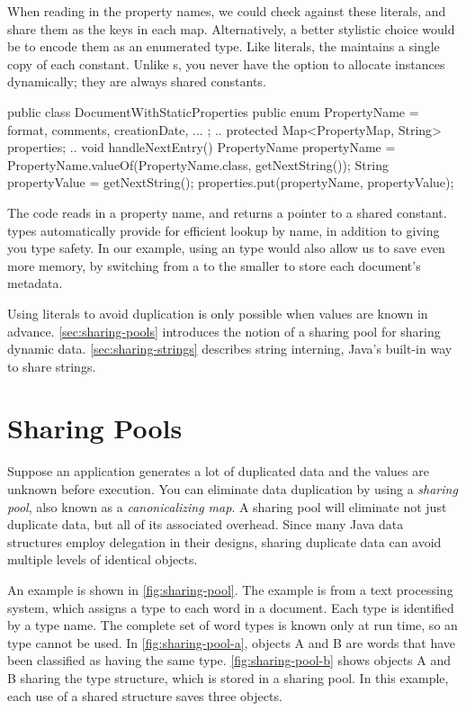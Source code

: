 When reading in the property names, we could check against these
literals, and share them as the keys in each map. 
Alternatively, a better stylistic choice would be to encode them as an
enumerated type. Like  literals, the \jre maintains a
single copy of each  constant. Unlike s,
you never have the option to allocate  instances dynamically; they
are always shared constants. 

\begin{shortlisting}
	public class DocumentWithStaticProperties {
		public enum PropertyName = 
			{format, comments, creationDate, ... };
		..
		protected Map<PropertyMap, String> properties; 
		..
		void handleNextEntry() {
			PropertyName propertyName = 
				PropertyName.valueOf(PropertyName.class, getNextString()); 
			String propertyValue = getNextString(); 
			properties.put(propertyName, propertyValue); }
	}
\end{shortlisting}

The code reads in a property name, and returns a pointer to a shared 
constant.  types automatically provide for
efficient lookup by name, in addition to giving you type safety. In our
example, using an  type would also allow us to save even more memory,
by switching from a  to the smaller  to store each document's metadata.

Using literals to avoid duplication is only possible when values are known in advance.
\autoref{sec:sharing-pools} introduces the notion of a sharing pool for
sharing dynamic data. \autoref{sec:sharing-strings} describes
string interning, Java's built-in way to share strings.

\section{Sharing Pools}
\label{sec:sharing-pools}

Suppose an application generates a lot of duplicated data and the values
are unknown before execution. 
You can eliminate data duplication by using a \emph{sharing pool}, also known
as a \emph{canonicalizing map}. 
A sharing pool will eliminate not just duplicate data, 
but all of its associated overhead. Since many Java data structures employ 
delegation in their designs, sharing duplicate data can avoid
multiple levels of identical objects.

An example is shown in \autoref{fig:sharing-pool}. The example is from a
text processing system, which assigns a type to each word in a document.
Each type is identified by a  type name.
The complete set of word types is known only at run time, so an 
type cannot be used.  In \autoref{fig:sharing-pool-a}, objects A and B
are words that have been classified as having the same type. 
\autoref{fig:sharing-pool-b} shows objects A and B sharing the type
structure, which is stored in a sharing pool. In this example, each use of a
shared structure saves three objects.

